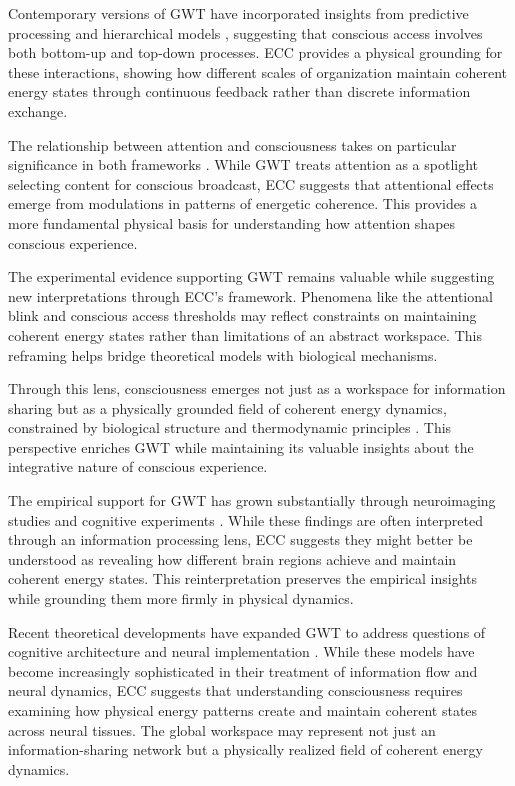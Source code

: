 \begin{refsection}
Contemporary versions of GWT have incorporated insights from predictive processing and hierarchical models \cite{Dehaene2011}, suggesting that conscious access involves both bottom-up and top-down processes. ECC provides a physical grounding for these interactions, showing how different scales of organization maintain coherent energy states through continuous feedback rather than discrete information exchange.

The relationship between attention and consciousness takes on particular significance in both frameworks \cite{Baars2013}. While GWT treats attention as a spotlight selecting content for conscious broadcast, ECC suggests that attentional effects emerge from modulations in patterns of energetic coherence. This provides a more fundamental physical basis for understanding how attention shapes conscious experience.

The experimental evidence supporting GWT \cite{Sergent2004} remains valuable while suggesting new interpretations through ECC's framework. Phenomena like the attentional blink and conscious access thresholds may reflect constraints on maintaining coherent energy states rather than limitations of an abstract workspace. This reframing helps bridge theoretical models with biological mechanisms.

Through this lens, consciousness emerges not just as a workspace for information sharing but as a physically grounded field of coherent energy dynamics, constrained by biological structure and thermodynamic principles \cite{Dehaene2001}. This perspective enriches GWT while maintaining its valuable insights about the integrative nature of conscious experience.

The empirical support for GWT has grown substantially through neuroimaging studies and cognitive experiments \cite{Dehaene2006}. While these findings are often interpreted through an information processing lens, ECC suggests they might better be understood as revealing how different brain regions achieve and maintain coherent energy states. This reinterpretation preserves the empirical insights while grounding them more firmly in physical dynamics.

Recent theoretical developments have expanded GWT to address questions of cognitive architecture and neural implementation \cite{Mashour2020}. While these models have become increasingly sophisticated in their treatment of information flow and neural dynamics, ECC suggests that understanding consciousness requires examining how physical energy patterns create and maintain coherent states across neural tissues. The global workspace may represent not just an information-sharing network but a physically realized field of coherent energy dynamics.


\end{refsection}
